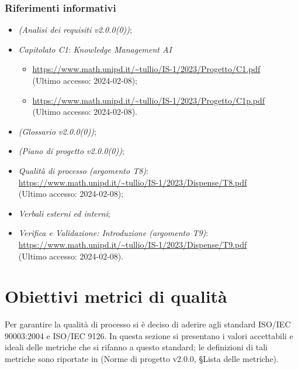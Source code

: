    \subsubsection{Riferimenti informativi}
    \begin{itemize}
        \item \textit{(Analisi dei requisiti v2.0.0(0))};
        \item \textit{Capitolato C1}: \textit{Knowledge Management AI}
            \begin{itemize}
                \item \url{https://www.math.unipd.it/~tullio/IS-1/2023/Progetto/C1.pdf}\\
                (Ultimo accesso: 2024-02-08);
                \item \url{https://www.math.unipd.it/~tullio/IS-1/2023/Progetto/C1p.pdf}\\
                (Ultimo accesso: 2024-02-08).
            \end{itemize}
        \item \textit{(Glossario v2.0.0(0))};
        \item \textit{(Piano di progetto v2.0.0(0))};
        \item \textit{Qualità di processo (argomento T8)}: \\
        \url{https://www.math.unipd.it/~tullio/IS-1/2023/Dispense/T8.pdf}\\
        (Ultimo accesso: 2024-02-08);
        \item \textit{Verbali esterni ed interni};
        \item \textit{Verifica e Validazione: Introduzione (argomento T9)}: \\
            \url{https://www.math.unipd.it/~tullio/IS-1/2023/Dispense/T9.pdf}\\
            (Ultimo accesso: 2024-02-08).
    \end{itemize}

    
\newpage
\section{Obiettivi metrici di qualità}
\label{ObiettiviQualità}
Per garantire la qualità di processo si è deciso di aderire agli standard ISO/IEC 90003:2004 e ISO/IEC 9126. In questa sezione si presentano i valori accettabili e ideali delle metriche che si rifanno a questo standard; le definizioni di tali metriche sono riportate in (Norme di progetto v2.0.0, \S Lista delle metriche).
